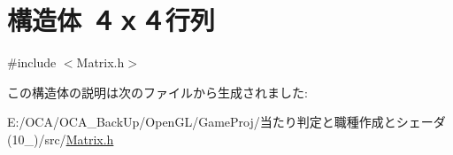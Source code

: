 \hypertarget{struct_xEF_xBC_x94_xEF_xBD_x98_xEF_xBC_x94_xE8_xA1_x8C_xE5_x88_x97}{\section{構造体 ４ｘ４行列}
\label{struct_xEF_xBC_x94_xEF_xBD_x98_xEF_xBC_x94_xE8_xA1_x8C_xE5_x88_x97}
}


{\ttfamily \#include $<$Matrix.\-h$>$}



この構造体の説明は次のファイルから生成されました\-:\begin{DoxyCompactItemize}
\item 
E\-:/\-O\-C\-A/\-O\-C\-A\-\_\-\-Back\-Up/\-Open\-G\-L/\-Game\-Proj/当たり判定と職種作成とシェーダ(10\-\_)/src/\hyperlink{_matrix_8h}{Matrix.\-h}\end{DoxyCompactItemize}
